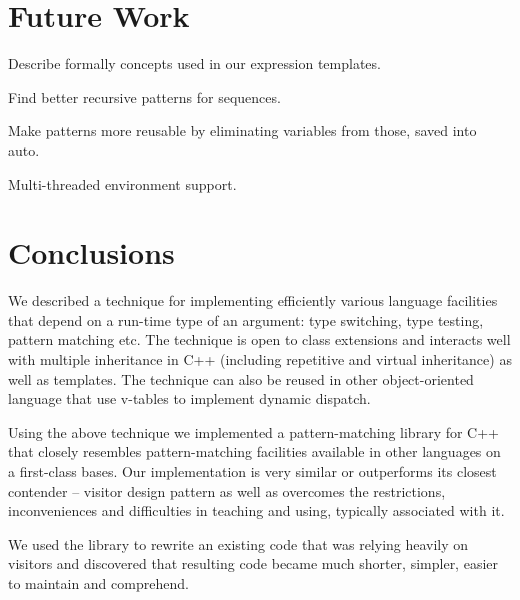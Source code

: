\documentclass[preprint]{sigplanconf}
\begin{document}
\section{Future Work} %
\label{sec:fw}

Describe formally concepts used in our expression templates.

Find better recursive patterns for sequences.

Make patterns more reusable by eliminating variables from those, saved into 
auto.

Multi-threaded environment support.

\section{Conclusions} %
\label{sec:cc}

We described a technique for implementing efficiently various language 
facilities that depend on a run-time type of an argument: type switching, type 
testing, pattern matching etc. The technique is open to class extensions and 
interacts well with multiple inheritance in C++ (including repetitive and 
virtual inheritance) as well as templates. The technique can also be reused in 
other object-oriented language that use v-tables to implement dynamic dispatch.

Using the above technique we implemented a pattern-matching library for C++ that 
closely resembles pattern-matching facilities available in other languages on a 
first-class bases. Our implementation is very similar or outperforms its closest 
contender -- visitor design pattern as well as overcomes the restrictions, 
inconveniences and difficulties in teaching and using, typically associated with 
it.

We used the library to rewrite an existing code that was relying heavily on 
visitors and discovered that resulting code became much shorter, simpler, easier 
to maintain and comprehend.

\end{document}
